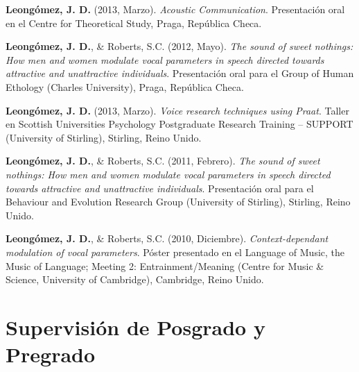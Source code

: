 \documentclass[11pt, a4paper]{awesome-cv}
\begin{document}
\textbf{Leongómez, J. D.} (2013, Marzo). \emph{Acoustic Communication}.
Presentación oral en el Centre for Theoretical Study, Praga, República
Checa.

\textbf{Leongómez, J. D.}, \& Roberts, S.C. (2012, Mayo). \emph{The
sound of sweet nothings: How men and women modulate vocal parameters in
speech directed towards attractive and unattractive individuals}.
Presentación oral para el Group of Human Ethology (Charles University),
Praga, República Checa.

\textbf{Leongómez, J. D.} (2013, Marzo). \emph{Voice research techniques
using Praat}. Taller en Scottish Universities Psychology Postgraduate
Research Training -- SUPPORT (University of Stirling), Stirling, Reino
Unido.

\textbf{Leongómez, J. D.}, \& Roberts, S.C. (2011, Febrero). \emph{The
sound of sweet nothings: How men and women modulate vocal parameters in
speech directed towards attractive and unattractive individuals}.
Presentación oral para el Behaviour and Evolution Research Group
(University of Stirling), Stirling, Reino Unido.

\textbf{Leongómez, J. D.}, \& Roberts, S.C. (2010, Diciembre).
\emph{Context-dependant modulation of vocal parameters}. Póster
presentado en el Language of Music, the Music of Language; Meeting 2:
Entrainment/Meaning (Centre for Music \& Science, University of
Cambridge), Cambridge, Reino Unido.

\endgroup

\hypertarget{supervisiuxf3n-de-posgrado-y-pregrado}{%
\section{Supervisión de Posgrado y
Pregrado}\label{supervisiuxf3n-de-posgrado-y-pregrado}}
\end{document}
